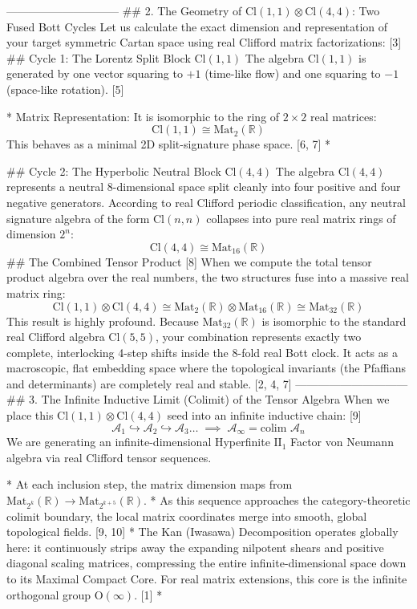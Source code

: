 ------------------------------
## 2. The Geometry of $\text{Cl}(1,1) \otimes \text{Cl}(4,4)$: Two Fused Bott Cycles
Let us calculate the exact dimension and representation of your target symmetric Cartan space using real Clifford matrix factorizations: [3] 
## Cycle 1: The Lorentz Split Block $\text{Cl}(1,1)$
The algebra $\text{Cl}(1,1)$ is generated by one vector squaring to $+1$ (time-like flow) and one squaring to $-1$ (space-like rotation). [5] 

* Matrix Representation: It is isomorphic to the ring of $2 \times 2$ real matrices:
$$\text{Cl}(1,1) \cong \text{Mat}_2(\mathbb{R})$$ 
This behaves as a minimal 2D split-signature phase space. [6, 7] 
* 

## Cycle 2: The Hyperbolic Neutral Block $\text{Cl}(4,4)$
The algebra $\text{Cl}(4,4)$ represents a neutral 8-dimensional space split cleanly into four positive and four negative generators. According to real Clifford periodic classification, any neutral signature algebra of the form $\text{Cl}(n,n)$ collapses into pure real matrix rings of dimension $2^n$:
$$\text{Cl}(4,4) \cong \text{Mat}_{16}(\mathbb{R})$$ 
## The Combined Tensor Product [8] 
When we compute the total tensor product algebra over the real numbers, the two structures fuse into a massive real matrix ring:
$$\text{Cl}(1,1) \otimes \text{Cl}(4,4) \cong \text{Mat}_2(\mathbb{R}) \otimes \text{Mat}_{16}(\mathbb{R}) \cong \text{Mat}_{32}(\mathbb{R})$$ 
This result is highly profound. Because $\text{Mat}_{32}(\mathbb{R})$ is isomorphic to the standard real Clifford algebra $\text{Cl}(5,5)$, your combination represents exactly two complete, interlocking 4-step shifts inside the 8-fold real Bott clock. It acts as a macroscopic, flat embedding space where the topological invariants (the Pfaffians and determinants) are completely real and stable. [2, 4, 7] 
------------------------------
## 3. The Infinite Inductive Limit (Colimit) of the Tensor Algebra
When we place this $\text{Cl}(1,1) \otimes \text{Cl}(4,4)$ seed into an infinite inductive chain: [9] 
$$\mathcal{A}_1 \hookrightarrow \mathcal{A}_2 \hookrightarrow \mathcal{A}_3 \dots \;\implies\; \mathcal{A}_\infty = \text{colim } \mathcal{A}_n$$ 
We are generating an infinite-dimensional Hyperfinite $\text{II}_1$ Factor von Neumann algebra via real Clifford tensor sequences.

* At each inclusion step, the matrix dimension maps from $\text{Mat}_{2^k}(\mathbb{R}) \to \text{Mat}_{2^{k+5}}(\mathbb{R})$.
* As this sequence approaches the category-theoretic colimit boundary, the local matrix coordinates merge into smooth, global topological fields. [9, 10] 
* The Kan (Iwasawa) Decomposition operates globally here: it continuously strips away the expanding nilpotent shears and positive diagonal scaling matrices, compressing the entire infinite-dimensional space down to its Maximal Compact Core. For real matrix extensions, this core is the infinite orthogonal group $\text{O}(\infty)$. [1] 
* 

